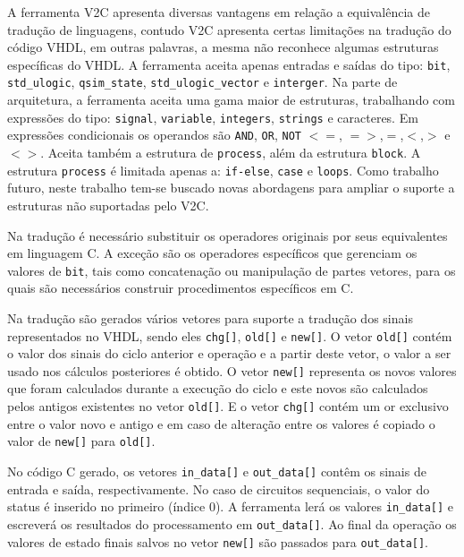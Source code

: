 \par
A ferramenta V2C apresenta diversas vantagens em relação a equivalência de tradução de linguagens, contudo V2C apresenta certas limitações na tradução do código VHDL, em outras palavras, a mesma não reconhece algumas estruturas específicas do VHDL. A ferramenta aceita apenas entradas e saídas do tipo: \texttt{bit}, \texttt{std\_ulogic}, \texttt{qsim\_state}, \texttt{std\_ulogic\_vector} e \texttt{interger}. Na parte de arquitetura, a ferramenta aceita uma gama maior de estruturas, trabalhando com expressões do tipo: \texttt{signal}, \texttt{variable}, \texttt{integers}, \texttt{strings} e caracteres. Em expressões condicionais os operandos são \texttt{AND}, \texttt{OR}, \texttt{NOT} $<=$, $=>$,$=$,$<$,$>$ e $<>$. Aceita também a estrutura de \texttt{process}, além da estrutura \texttt{block}. A estrutura \texttt{process} é limitada apenas a: \texttt{if-else}, \texttt{case} e \texttt{loops}. Como trabalho futuro, neste trabalho tem-se buscado novas abordagens para ampliar o suporte a estruturas não suportadas pelo V2C.

\par
Na tradução é necessário substituir os operadores originais por seus equivalentes em linguagem C. A exceção são os operadores específicos que gerenciam os valores de \texttt{bit}, tais como concatenação ou manipulação de partes vetores, para os quais são necessários construir procedimentos específicos em C.

Na tradução são gerados vários vetores para suporte a tradução dos sinais representados no VHDL, sendo eles \texttt{chg[]}, \texttt{old[]} e \texttt{new[]}. O vetor \texttt{old[]} contém o valor dos sinais do ciclo anterior e operação e a partir deste vetor, o valor a ser usado nos cálculos posteriores é obtido. O vetor \texttt{new[]} representa os novos valores que foram calculados durante a execução do ciclo e este novos são calculados pelos antigos existentes no vetor \texttt{old[]}. E o vetor \texttt{chg[]} contém um or exclusivo entre o valor novo e antigo e em caso de alteração entre os valores é copiado o valor de \texttt{new[]} para \texttt{old[]}.

\par
No código C gerado, os vetores \texttt{in\_data[]} e \texttt{out\_data[]} contêm os sinais de entrada e saída, respectivamente. No caso de circuitos sequenciais, o valor do status é inserido no primeiro (índice 0). A ferramenta lerá os valores \texttt{in\_data[]} e escreverá os resultados do processamento em \texttt{out\_data[]}. Ao final da operação os valores de estado finais salvos no vetor \texttt{new[]} são passados para \texttt{out\_data[]}.

